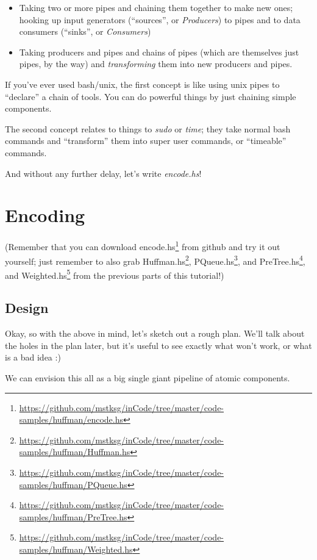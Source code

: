 \documentclass[]{article}
\renewcommand{\href}[2]{#2\footnote{\url{#1}}}
\begin{document}
\begin{itemize}
\item
  Taking two or more pipes and chaining them together to make new ones; hooking
  up input generators (``sources'', or \emph{Producers}) to pipes and to data
  consumers (``sinks'', or \emph{Consumers})
\item
  Taking producers and pipes and chains of pipes (which are themselves just
  pipes, by the way) and \emph{transforming} them into new producers and pipes.
\end{itemize}

If you've ever used bash/unix, the first concept is like using unix pipes to
``declare'' a chain of tools. You can do powerful things by just chaining simple
components.

The second concept relates to things to \emph{sudo} or \emph{time}; they take
normal bash commands and ``transform'' them into super user commands, or
``timeable'' commands.

And without any further delay, let's write \emph{encode.hs}!

\section{Encoding}\label{encoding}

(Remember that you can download
\href{https://github.com/mstksg/inCode/tree/master/code-samples/huffman/encode.hs}{encode.hs}
from github and try it out yourself; just remember to also grab
\href{https://github.com/mstksg/inCode/tree/master/code-samples/huffman/Huffman.hs}{Huffman.hs},
\href{https://github.com/mstksg/inCode/tree/master/code-samples/huffman/PQueue.hs}{PQueue.hs},
and
\href{https://github.com/mstksg/inCode/tree/master/code-samples/huffman/PreTree.hs}{PreTree.hs},
and
\href{https://github.com/mstksg/inCode/tree/master/code-samples/huffman/Weighted.hs}{Weighted.hs}
from the previous parts of this tutorial!)

\subsection{Design}\label{design}

Okay, so with the above in mind, let's sketch out a rough plan. We'll talk about
the holes in the plan later, but it's useful to see exactly what won't work, or
what is a bad idea :)

We can envision this all as a big single giant pipeline of atomic components.
\end{document}
